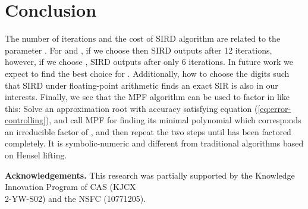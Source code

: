 \documentclass{sig-alternate}
\numberwithin{theorem}{section} \numberwithin{equation}{section}
\begin{document}
\section{Conclusion}\label{sec:conclude}

The number of iterations and the cost of SIRD algorithm are related
to the parameter . For  and
, if we choose  then
SIRD outputs  after 12 iterations, however,
if we choose , SIRD outputs   after
only 6 iterations. In future work we expect to find the best choice
for . Additionally, how to choose the digits such that SIRD
under floating-point arithmetic finds an exact SIR is also in our
interests.
Finally, we see that the MPF algorithm can be used to factor  in
 like this: Solve an approximation root with accuracy
satisfying  equation (\ref{eq:error-controlling}), and  call MPF for
finding its minimal polynomial which corresponds an irreducible
factor of , and then repeat the two steps until  has been
factored completely.
It is symbolic-numeric  and different from traditional algorithms
based on Hensel lifting.\vspace{1 mm}


\textbf{Acknowledgements.} This research was partially supported by
the Knowledge Innovation Program of CAS (KJCX\\2-YW-S02) and the NSFC (10771205).
\end{document}
